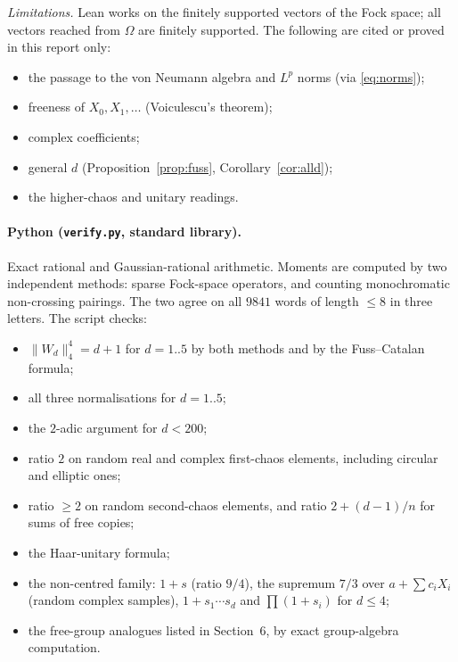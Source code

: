 \documentclass[11pt]{article}
\theoremstyle{definition}
\theoremstyle{remark}
\begin{document}
\emph{Limitations.} Lean works on the finitely supported vectors of the Fock space; all vectors
reached from $\Omega$ are finitely supported. The following are cited or proved in this report
only:
\begin{itemize}
\item the passage to the von Neumann algebra and $L^p$ norms (via \eqref{eq:norms});
\item freeness of $X_0,X_1,\dots$ (Voiculescu's theorem);
\item complex coefficients;
\item general $d$ (Proposition~\ref{prop:fuss}, Corollary~\ref{cor:alld});
\item the higher-chaos and unitary readings.
\end{itemize}

\paragraph{Python (\texttt{verify.py}, standard library).} Exact rational and Gaussian-rational
arithmetic. Moments are computed by two independent methods: sparse Fock-space operators, and
counting monochromatic non-crossing pairings. The two agree on all $9841$ words of length $\le8$
in three letters. The script checks:
\begin{itemize}
\item $\|W_d\|_4^4=d+1$ for $d=1..5$ by both methods and by the Fuss--Catalan formula;
\item all three normalisations for $d=1..5$;
\item the $2$-adic argument for $d<200$;
\item ratio $2$ on random real and complex first-chaos elements, including circular and
elliptic ones;
\item ratio $\ge2$ on random second-chaos elements, and ratio $2+(d-1)/n$ for sums of free copies;
\item the Haar-unitary formula;
\item the non-centred family: $1+s$ (ratio $9/4$), the supremum $7/3$ over $a+\sum c_iX_i$
(random complex samples), $1+s_1\cdots s_d$ and $\prod(1+s_i)$ for $d\le4$;
\item the free-group analogues listed in Section~6, by exact group-algebra computation.
\end{itemize}
\end{document}
